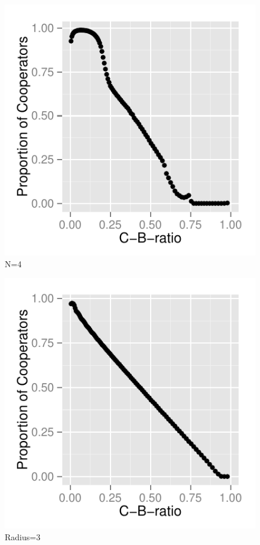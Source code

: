 \documentclass[DIV=calc, paper=a4, fontsize=11pt, twocolumn]{scrartcl}	 %
\begin{document}
\begin{figure}[here]
\centering
\begin{minipage}{.35\textwidth}
  \centering
  \includegraphics[width=1\linewidth]{HDN4}
 \caption{N=4}
\label{fig:HDn1}
\end{minipage}%
\end{figure}

\begin{figure}[here]
\centering
\begin{minipage}{.35\textwidth}
  \centering
  \includegraphics[width=1\linewidth]{HDN3}
 \caption{Radius=3}
\label{fig:HDm3}
\end{minipage}%
\end{figure}
\end{document}
